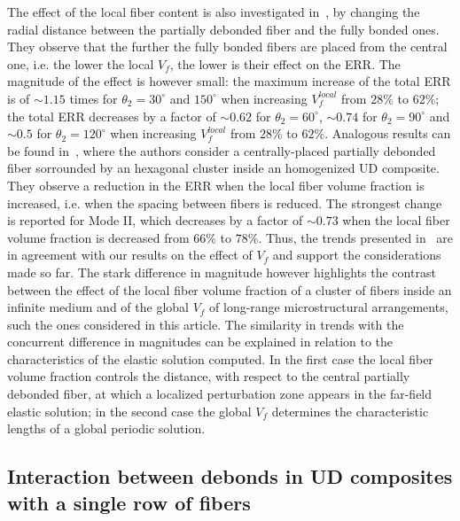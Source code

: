 The effect of the local fiber content is also investigated in~\cite{Sandino2016}, by changing the radial distance between the partially debonded fiber and the fully bonded ones. They observe that the further the fully bonded fibers are placed from the central one, i.e. the lower the local $V_{f}$, the lower is their effect on the ERR. The magnitude of the effect is however small: the maximum increase of the total ERR is of $\sim1.15$ times for $\theta_{2}=30^{\circ}$ and $150^{\circ}$ when increasing $V_{f}^{local}$ from $28\%$ to $62\%$; the total ERR decreases by a factor of $\sim0.62$ for $\theta_{2}=60^{\circ}$, $\sim0.74$ for $\theta_{2}=90^{\circ}$ and $\sim0.5$ for $\theta_{2}=120^{\circ}$ when increasing $V_{f}^{local}$ from $28\%$ to $62\%$. Analogous results can be found in~\cite{Zhuang2018}, where the authors consider a centrally-placed partially debonded fiber sorrounded by an hexagonal cluster inside an homogenized UD composite. They observe a reduction in the ERR when the local fiber volume fraction is increased, i.e. when the spacing between fibers is reduced. The strongest change is reported for Mode II, which decreases by a factor of $\sim0.73$ when the local fiber volume fraction is decreased from $66\%$ to $78\%$. Thus, the trends presented in~\cite{Sandino2016,Zhuang2018} are in agreement with our results on the effect of $V_{f}$ and support the considerations made so far. The stark difference in magnitude however highlights the contrast between the effect of the local fiber volume fraction of a cluster of fibers inside an infinite medium and of the global $V_{f}$ of long-range microstructural arrangements, such the ones considered in this article. The similarity in trends with the concurrent difference in magnitudes can be explained in relation to the characteristics of the elastic solution computed. In the first case the local fiber volume fraction controls the distance, with respect to the central partially debonded fiber, at which a localized perturbation zone appears in the far-field elastic solution; in the second case the global $V_{f}$ determines the characteristic lengths of a global periodic solution.

\subsection{Interaction between debonds in UD composites with a single row of fibers}\label{paperB:subsec:singlefiberud}

